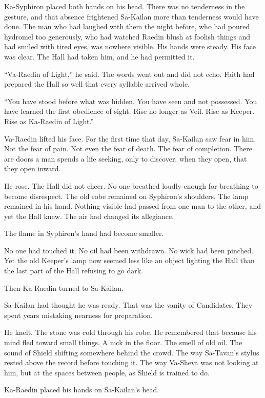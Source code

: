 Ka-Syphiron placed both hands on his head.
There was no tenderness in the gesture, and that absence frightened Sa-Kailan more than tenderness would have done.
The man who had laughed with them the night before, who had poured hydromel too generously, who had watched Raedin blush at foolish things and had smiled with tired eyes, was nowhere visible.
His hands were steady.
His face was clear.
The Hall had taken him, and he had permitted it.\par
“Va-Raedin of Light,” he said.
The words went out and did not echo.
Faith had prepared the Hall so well that every syllable arrived whole.\par
“You have stood before what was hidden.
You have seen and not possessed.
You have learned the first obedience of sight.
Rise no longer as Veil.
Rise as Keeper.
Rise as Ka-Raedin of Light.”\par
Va-Raedin lifted his face.
For the first time that day, Sa-Kailan saw fear in him.
Not the fear of pain.
Not even the fear of death.
The fear of completion.
There are doors a man spends a life seeking, only to discover, when they open, that they open inward.\par
He rose.
The Hall did not cheer.
No one breathed loudly enough for breathing to become disrespect.
The old robe remained on Syphiron’s shoulders.
The lamp remained in his hand.
Nothing visible had passed from one man to the other, and yet the Hall knew.
The air had changed its allegiance.\par
The flame in Syphiron’s hand had become smaller.\par
No one had touched it.
No oil had been withdrawn.
No wick had been pinched.
Yet the old Keeper’s lamp now seemed less like an object lighting the Hall than the last part of the Hall refusing to go dark.\par
Then Ka-Raedin turned to Sa-Kailan.\par
Sa-Kailan had thought he was ready.
That was the vanity of Candidates.
They spent years mistaking nearness for preparation.\par
He knelt.
The stone was cold through his robe.
He remembered that because his mind fled toward small things.
A nick in the floor.
The smell of old oil.
The sound of Shield shifting somewhere behind the crowd.
The way Sa-Tavan’s stylus rested above the record before touching it.
The way Va-Sheva was not looking at him, but at the spaces between people, as Shield is trained to do.\par
Ka-Raedin placed his hands on Sa-Kailan’s head.
